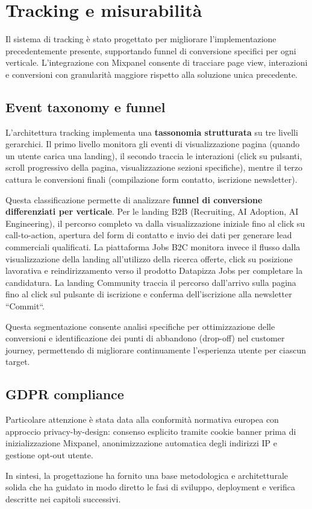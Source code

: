 \section{Tracking e misurabilità}
Il sistema di tracking è stato progettato per migliorare l'implementazione 
precedentemente presente, supportando funnel di conversione specifici per ogni 
verticale. L'integrazione con Mixpanel consente di tracciare page view, 
interazioni e conversioni con granularità maggiore rispetto alla soluzione unica 
precedente.

\subsection{Event taxonomy e funnel}
L'architettura tracking implementa una \textbf{tassonomia strutturata} 
su tre livelli gerarchici. Il primo livello monitora gli eventi di 
visualizzazione pagina (quando un utente carica una landing), il secondo 
traccia le interazioni (click su pulsanti, scroll progressivo della pagina, 
visualizzazione sezioni specifiche), mentre il terzo cattura le conversioni 
finali (compilazione form contatto, iscrizione newsletter).

Questa classificazione permette di analizzare \textbf{funnel di conversione 
differenziati per verticale}. Per le landing B2B (Recruiting, AI Adoption, 
AI Engineering), il percorso completo va dalla visualizzazione iniziale 
fino al click su call-to-action, apertura del form di contatto e invio 
dei dati per generare lead commerciali qualificati. La piattaforma Jobs 
B2C monitora invece il flusso dalla visualizzazione della landing all'utilizzo 
della ricerca offerte, click su posizione lavorativa e reindirizzamento 
verso il prodotto Datapizza Jobs per completare la candidatura. La landing 
Community traccia il percorso dall'arrivo sulla pagina fino al click sul 
pulsante di iscrizione e conferma dell'iscrizione alla newsletter ``Commit``.

Questa segmentazione consente analisi specifiche per ottimizzazione delle 
conversioni e identificazione dei punti di abbandono (drop-off) nel customer 
journey, permettendo di migliorare continuamente l'esperienza utente per 
ciascun target.

\subsection{GDPR compliance}
Particolare attenzione è stata data alla conformità normativa europea con 
approccio privacy-by-design: consenso esplicito tramite cookie banner prima 
di inizializzazione Mixpanel, anonimizzazione automatica degli indirizzi IP 
e gestione opt-out utente.

\bigskip
In sintesi, la progettazione ha fornito una base metodologica e architetturale 
solida che ha guidato in modo diretto le fasi di sviluppo, deployment e verifica 
descritte nei capitoli successivi.